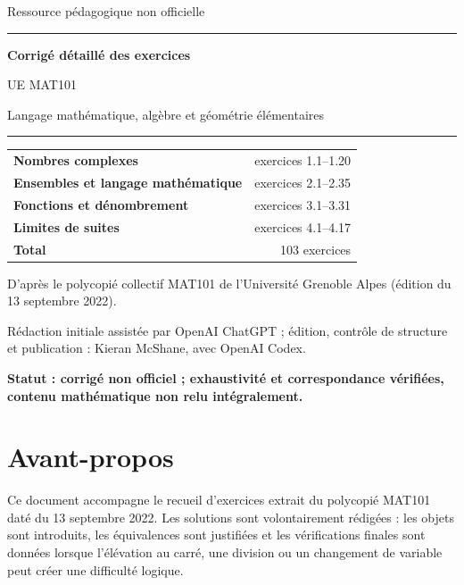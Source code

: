 \documentclass[11pt,a4paper]{article}
\newcommand{\1}{\mathbf 1}
\begin{document}
\hypersetup{pageanchor=false}

\begin{titlepage}
  \centering
  \vspace*{1.6cm}
  {\Large Ressource pédagogique non officielle\par}
  \vspace{0.8cm}
  {\color{MATblue}\rule{0.86\textwidth}{1.2pt}\par}
  \vspace{0.9cm}
  {\Huge\bfseries Corrigé détaillé des exercices\par}
  \vspace{0.35cm}
  {\LARGE UE MAT101\par}
  \vspace{0.65cm}
  {\large Langage mathématique, algèbre et géométrie élémentaires\par}
  \vspace{0.9cm}
  {\color{MATblue}\rule{0.86\textwidth}{1.2pt}\par}
  \vfill
  \begin{tabular}{>{\bfseries}l r}
    Nombres complexes & exercices 1.1--1.20 \\
    Ensembles et langage mathématique & exercices 2.1--2.35 \\
    Fonctions et dénombrement & exercices 3.1--3.31 \\
    Limites de suites & exercices 4.1--4.17 \\
    \midrule
    Total & 103 exercices
  \end{tabular}
  \vfill
  {\small D'après le polycopié collectif MAT101 de l'Université Grenoble Alpes (édition du 13 septembre 2022).\par}
  {\small Rédaction initiale assistée par OpenAI ChatGPT ; édition, contrôle de structure et publication : Kieran McShane, avec OpenAI Codex.\par}
  {\small\bfseries Statut : corrigé non officiel ; exhaustivité et correspondance vérifiées, contenu mathématique non relu intégralement.\par}
\end{titlepage}

\section*{Avant-propos}
Ce document accompagne le recueil d'exercices extrait du polycopié MAT101 daté du 13 septembre 2022. Les solutions sont volontairement rédigées : les objets sont introduits, les équivalences sont justifiées et les vérifications finales sont données lorsque l'élévation au carré, une division ou un changement de variable peut créer une difficulté logique.
\end{document}
